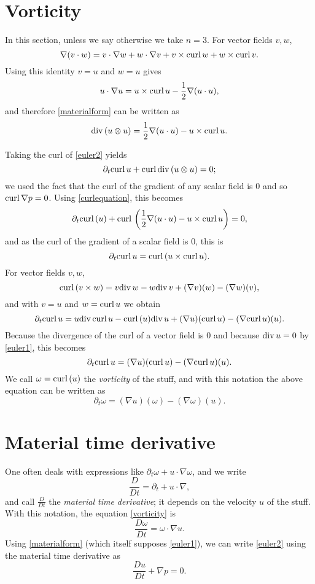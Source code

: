\documentclass{article}
\renewcommand{\div}{\ensuremath\mathrm{div}\,}
\newcommand{\curl}{\ensuremath\mathrm{curl}\,}
\theoremstyle{definition}
\begin{document}
\section{Vorticity}
In this section, unless we say otherwise we take $n=3$.  For vector fields $v,w$,
\[
\nabla(v \cdot w) = v\cdot  \nabla w + w \cdot \nabla v + v \times \curl w + w \times \curl v.
\]
Using this identity $v=u$ and $w=u$ gives
\[
u \cdot \nabla u = u \times \curl u - \frac{1}{2} \nabla(u \cdot u),
\]
and therefore \eqref{materialform} can be written as
\begin{equation}
\div(u \otimes u) =\frac{1}{2}\nabla(u \cdot u) - u \times \curl u.
\label{curlequation}
\end{equation}

Taking the curl of \eqref{euler2} yields
\[
\partial_t \curl u + \curl \div(u \otimes u) =0;
\]
we used the fact that
the curl of the gradient of any scalar field is $0$ and so $\curl \nabla p=0$.
Using \eqref{curlequation}, this becomes
\[
\partial_t \curl(u) + \curl\left( \frac{1}{2} \nabla(u\cdot u) - u \times \curl u \right) = 0,
\]
and as the curl of the gradient of a scalar field is $0$, this is
\[
\partial_t \curl u = \curl(u \times \curl u).
\]
For vector fields $v,w$,
\[
\curl(v \times w) = v \div w - w \div v + (\nabla v)(w) - (\nabla w)(v),
\]
and with $v=u$ and $w=\curl u$ we obtain
\[
\partial_t \curl u = u \div \curl u - \curl(u) \div u + (\nabla u)(\curl u) - (\nabla \curl u)(u).
\]
Because the divergence of the curl of a vector field is $0$ and because $\div u=0$ by \eqref{euler1}, this becomes
\[
\partial_t \curl u  = (\nabla u)(\curl u) - (\nabla \curl u)(u).
\]
We call $\omega=\curl(u)$ the {\em vorticity} of the stuff, and with this notation the above equation can
be written as
\begin{equation}
\partial_t \omega  = (\nabla u)(\omega)-(\nabla \omega)(u).
\label{vorticity}
\end{equation}



\section{Material time derivative}
One often deals with expressions like $\partial_t \omega + u \cdot \nabla \omega$, and we 
write
\[
\frac{D}{Dt} = \partial_t + u\cdot \nabla,
\]
and call $\frac{D}{Dt}$ the {\em material time derivative}; it depends on the velocity $u$
of the stuff. With this notation, the equation \eqref{vorticity}
is
\[
\frac{D\omega}{Dt} = \omega \cdot \nabla u.
\]
Using \eqref{materialform} (which itself supposes \eqref{euler1}), we can write \eqref{euler2} using the material time derivative as
\[
\frac{Du}{Dt} + \nabla p=0.
\]
\end{document}
